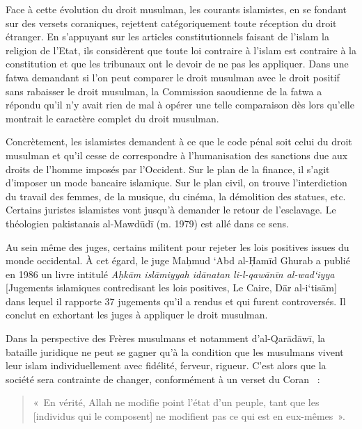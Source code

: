 
Face à cette évolution du droit musulman, les courants islamistes, en se
fondant sur des versets coraniques, rejettent catégoriquement toute
réception du droit étranger. En s'appuyant sur les articles
constitutionnels faisant de l'islam la religion de l'Etat, ils
considèrent que toute loi contraire à l'islam est contraire à la
constitution et que les tribunaux ont le devoir de ne pas les appliquer.
Dans une fatwa demandant si l'on peut comparer le droit musulman avec le
droit positif sans rabaisser le droit musulman, la Commission saoudienne
de la fatwa a répondu qu'il n'y avait rien de mal à opérer une telle
comparaison dès lors qu'elle montrait le caractère complet du droit
musulman.

Concrètement, les islamistes demandent à ce que le code pénal soit celui
du droit musulman et qu'il cesse de correspondre à l'humanisation des
sanctions due aux droits de l'homme imposés par l'Occident. Sur le plan
de la finance, il s'agit d'imposer un mode bancaire islamique. Sur le
plan civil, on trouve l'interdiction du travail des femmes, de la
musique, du cinéma, la démolition des statues, etc. Certains juristes
islamistes vont jusqu'à demander le retour de l'esclavage. Le théologien
pakistanais al-Mawdūdī (m. 1979) est allé dans ce sens.

Au sein même des juges, certains militent pour rejeter les lois
positives issues du monde occidental. À cet égard, le juge Maḥmud `Abd
al-Ḥamīd Ghurab a publié en 1986 un livre intitulé \emph{Aḥkām
islāmiyyah idānatan li-l-qawānīn al-wad`iyya} {[}Jugements islamiques
contredisant les lois positives, Le Caire, Dār al-i`tisām{]} dans lequel
il rapporte 37 jugements qu'il a rendus et qui furent controversés. Il
conclut en exhortant les juges à appliquer le droit musulman.

Dans la perspective des Frères musulmans et notamment d'al-Qarādāwī, la
bataille juridique ne peut se gagner qu'à la condition que les musulmans
vivent leur islam individuellement avec fidélité, ferveur, rigueur.
C'est alors que la société sera contrainte de changer, conformément à un
verset du Coran~  :


\begin{quote}
    

«~En vérité, Allah ne modifie point l'état d'un peuple, tant que les
{[}individus qui le composent{]} ne modifient pas ce qui est en
eux-mêmes~».
\end{quote}

